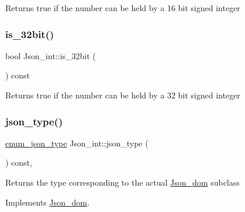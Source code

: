 \begin{DoxyReturn}{Returns}
true if the number can be held by a 16 bit signed integer 
\end{DoxyReturn}
\mbox{\label{classJson__int_aecb590d2898e44fcbc9c331028739abf}} 
\subsubsection{\texorpdfstring{is\+\_\+32bit()}{is\_32bit()}}
{\footnotesize\ttfamily bool Json\+\_\+int\+::is\+\_\+32bit (\begin{DoxyParamCaption}{ }\end{DoxyParamCaption}) const\hspace{0.3cm}{\ttfamily [inline]}}

\begin{DoxyReturn}{Returns}
true if the number can be held by a 32 bit signed integer 
\end{DoxyReturn}
\mbox{\label{classJson__int_a7990797f02dcd489c4fac63b0d16862e}} 
\subsubsection{\texorpdfstring{json\+\_\+type()}{json\_type()}}
{\footnotesize\ttfamily \mbox{\hyperlink{classJson__dom_af37eed7dfe1da1d6507d3ab85320eb03}{enum\+\_\+json\+\_\+type}} Json\+\_\+int\+::json\+\_\+type (\begin{DoxyParamCaption}{ }\end{DoxyParamCaption}) const\hspace{0.3cm}{\ttfamily [inline]}, {\ttfamily [virtual]}}

\begin{DoxyReturn}{Returns}
the type corresponding to the actual \mbox{\hyperlink{classJson__dom}{Json\+\_\+dom}} subclass 
\end{DoxyReturn}


Implements \mbox{\hyperlink{classJson__dom_aed953eca1e112aade66511ad1bbf82b8}{Json\+\_\+dom}}.

\mbox{\label{classJson__int_af5e8bf4dc1c2ba6846262e607333dbee}} 
